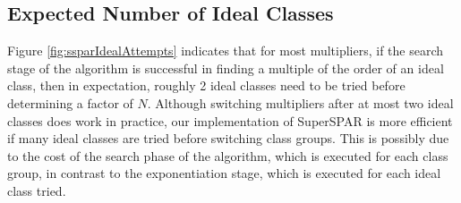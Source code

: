 \documentclass{ucalgthes1}
\theoremstyle{definition}
\begin{document}
\subsection{Expected Number of Ideal Classes}
\label{subsec:ssparExpIdeals}

Figure \ref{fig:ssparIdealAttempts} indicates that for most multipliers, if the search stage of the algorithm is successful in finding a multiple of the order of an ideal class, then in expectation, roughly 2 ideal classes need to be tried before determining a factor of $N$.  Although switching multipliers after at most two ideal classes does work in practice, our implementation of SuperSPAR is more efficient if many ideal classes are tried before switching class groups.  This is possibly due to the cost of the search phase of the algorithm, which is executed for each class group, in contrast to the exponentiation stage, which is executed for each ideal class tried.
\end{document}
